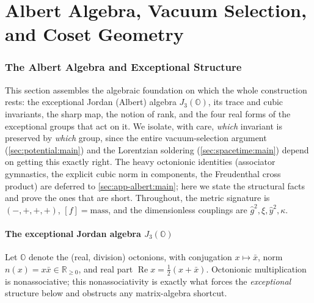 \documentclass[11pt]{article}
\theoremstyle{plain}
\theoremstyle{definition}
\theoremstyle{remark}
\begin{document}
\part{Albert Algebra, Vacuum Selection, and Coset Geometry}
\section{The Albert Algebra and Exceptional Structure}
\label{sec:albert:main}

This section assembles the algebraic foundation on which the whole
construction rests: the exceptional Jordan (Albert) algebra
$J_{3}(\mathbb{O})$, its trace and cubic invariants, the sharp map, the
notion of rank, and the four real forms of the exceptional groups that
act on it. We isolate, with care, \emph{which} invariant is preserved by
\emph{which} group, since the entire vacuum-selection argument
(\autoref{sec:potential:main}) and the Lorentzian soldering
(\autoref{sec:spacetime:main}) depend on getting this exactly right. The
heavy octonionic identities (associator gymnastics, the explicit cubic
norm in components, the Freudenthal cross product) are deferred to
\autoref{sec:app-albert:main}; here we state the structural facts and prove
the ones that are short. Throughout, the metric signature is
$(-,+,+,+)$, $[f]=\mathrm{mass}$, and the dimensionless couplings are
$\hat g^{2},\xi,\hat y^{2},\kappa$.

\subsection{The exceptional Jordan algebra \texorpdfstring{$J_{3}(\mathbb{O})$}{J3(O)}}
\label{sec:albert:def}

Let $\mathbb{O}$ denote the (real, division) octonions, with conjugation
$x\mapsto \bar x$, norm $n(x)=x\bar x\in\mathbb{R}_{\ge 0}$, and real part
$\operatorname{Re} x=\tfrac12(x+\bar x)$. Octonionic multiplication is
nonassociative; this nonassociativity is exactly what forces the
\emph{exceptional} structure below and obstructs any matrix-algebra
shortcut.
\end{document}
